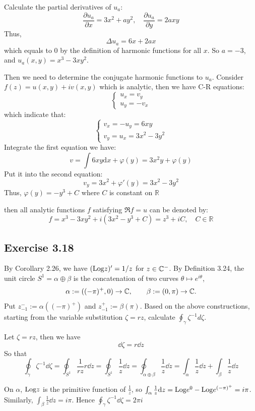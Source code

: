 \documentclass{article}
\begin{document}
\begin{solution}
  Calculate the partial derivatives of $u_a$:
  \[
    \frac{\partial u_a}{\partial x} = 3x^2 + ay^2, \quad
    \frac{\partial u_a}{\partial y} = 2axy
  \]
  Thus,
  \[
    \Delta u_a = 6x+2ax
  \]
  which equals to 0 by the definition of harmonic functions for all
  $x$. So $a = -3$, and $u_a(x,y) = x^3-3xy^2$.

  Then we need to determine the conjugate harmonic functions to
  $u_a$. Consider $f(z) = u(x,y) + iv(x,y)$ which is analytic, then
  we have C-R equations:
  \[
    \begin{cases}
      u_x = v_y \\
      u_y = -v_x
    \end{cases}
  \]
  which indicate that:
  \[
    \begin{cases}
      v_x = -u_y = 6xy \\
      v_y = u_x = 3x^2 - 3y^2
    \end{cases}
  \]
  Integrate the first equation we have:
  \[
    v = \int 6xy \mathrm{d}x + \varphi(y) = 3x^2y+\varphi(y)
  \]
  Put it into the second equation:
  \[
    v_y = 3x^2 + \varphi'(y) = 3x^2 - 3y^2
  \]
  Thus, $\varphi(y) = -y^3 + C$ where $C$ is constant on $\mathbb{R}$

  then all analytic functions $f$ satisfying $\Re f = u$ can be denoted by:
  \[
    f = x^3 - 3xy^2 + i(3x^2 - y^3 + C) = z^3 + iC,\quad C \in \mathbb{R}
  \]

\end{solution}

\subsection{Exercise 3.18}

By Corollary 2.26, we have $(\mathrm{Log} z)' = 1/z$ for $z \in \mathbb{C}^-$. By
Definition 3.24, the unit circle $S^1 = \alpha \oplus \beta$ is the
concatenation of two curves $\theta \mapsto e^{i\theta}$,
\[
  \alpha := ((-\pi)^+, 0) \to \mathbb{C}, \qquad \beta := (0, \pi) \to \mathbb{C}.
\]
Put $z_{-1}^- := \alpha((-\pi)^+)$ and $z_{-1}^+ := \beta(\pi)$.
Based on the above constructions, starting from the variable
substitution $\zeta = rz$, calculate $\oint_\gamma \zeta^{-1}d\zeta$.

\begin{solution}
  Let $\zeta = rz$, then we have
  \[
    \dd \zeta = r \dd z
  \]
  So that
  \[
    \oint_\gamma \zeta^{-1} \dd \zeta = \oint_{S^1} \frac{1}{rz} r\dd
    z = \oint_{S^1}\frac{1}{z} \dd z = \oint_{\alpha\oplus \beta}
    \frac{1}{z} \dd z =
    \int_{\alpha} \frac{1}{z} \dd z + \int_{\beta} \frac{1}{z} \dd z
  \]

  On $\alpha$, $\mathrm{Log} z$ is the primitive function of $\frac{1}{z}$,
  so $\int_\alpha \frac{1}{z} \mathrm{d} z = \mathrm{Log} e^0 - \mathrm{Log} e^{(-\pi)^+} =
  i\pi$. Similarly, $\int_\beta \frac{1}{z} \dd z = i\pi$. Hence
  $\oint_\gamma \zeta^{-1} \dd \zeta = 2\pi i$
\end{solution}
\end{document}
